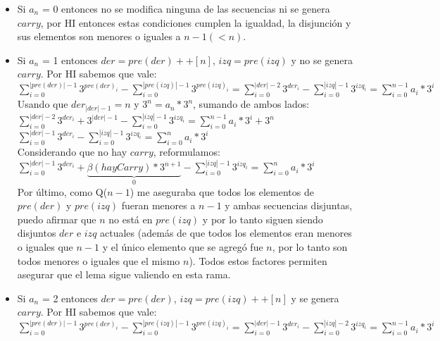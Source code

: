 	\begin{itemize}
	\item Si $a_n$ = 0 entonces no se modifica ninguna de las secuencias ni se genera $carry$, por HI entonces estas condiciones cumplen la igualdad, la disjunción y sus elementos son menores o iguales a $n-1 (< n)$.
	\item Si $a_n$ = 1 entonces $der = pre(der)++[n] $, $izq = pre(izq)$ y no se genera $carry$. Por HI sabemos que vale:
	\\

	$\sum_{i=0}^{|pre(der)|-1} 3^{pre(der)_i} - \sum_{i=0}^{|pre(izq)|-1} 3^{pre(izq)_i} = \sum_{i=0}^{|der|-2} 3^{der_i} - \sum_{i=0}^{|izq|-1} 3^{izq_i} = \sum_{i=0}^{n-1} a_i*3^{i}$
	\\

	Usando que $der_{|der|-1} = n$ y $ 3^{n} = a_{n}*3^{n}$, sumando de ambos lados:
	\\

	$\sum_{i=0}^{|der|-2} 3^{der_i} + 3^{|der|-1} - \sum_{i=0}^{|izq|-1} 3^{izq_i} = \sum_{i=0}^{n-1} a_i*3^{i} + 3^{n} $
	\\

	$\sum_{i=0}^{|der|-1} 3^{der_i} - \sum_{i=0}^{|izq|-1} 3^{izq_i} = \sum_{i=0}^{n} a_i*3^{i}$
	\\

	Considerando que no hay $carry$, reformulamos: \\

	$\sum_{i=0}^{|der|-1} 3^{der_i} + \underbrace{\beta(hayCarry)*3^{n+1}}_\text{0} - \sum_{i=0}^{|izq|-1} 3^{izq_i} = \sum_{i=0}^{n} a_i*3^{i} $
	\\

	Por último, como Q($n-1$) me aseguraba que todos los elementos de $pre(der)$ y $pre(izq)$ fueran menores a $n-1$ y ambas secuencias disjuntas, puedo afirmar que $n$ no está en $pre(izq)$ y por lo tanto siguen siendo disjuntos $der$ e $izq$ actuales (además de que todos los elementos eran menores o iguales que $n-1$ y el único elemento que se agregó fue $n$, por lo tanto son todos menores o iguales que el mismo $n$). Todos estos factores permiten asegurar que el lema sigue valiendo en esta rama.

	\item Si $a_n$ = 2 entonces $der = pre(der)$, $izq = pre(izq)++[n]$ y se genera $carry$. Por HI sabemos que vale:
	\\

	$\sum_{i=0}^{|pre(der)|-1} 3^{pre(der)_i} - \sum_{i=0}^{|pre(izq)|-1} 3^{pre(izq)_i} = \sum_{i=0}^{|der|-1} 3^{der_i} - \sum_{i=0}^{|izq|-2} 3^{izq_i} = \sum_{i=0}^{n-1} a_i*3^{i} $
	\\


\end{itemize}
